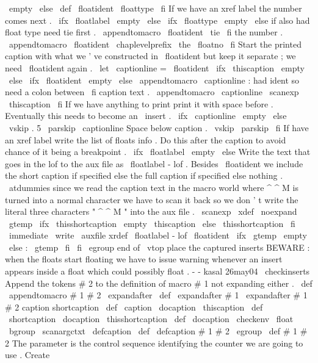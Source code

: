 {{{{{\
empty
\
else
\
def
\
floatident
{
\
floattype
}
\
fi
%
%
If
we
have
an
xref
label
the
number
comes
next
.
\
ifx
\
floatlabel
\
empty
\
else
\
ifx
\
floattype
\
empty
\
else
%
if
also
had
float
type
need
tie
first
.
\
appendtomacro
\
floatident
{
\
tie
}
%
\
fi
%
the
number
.
\
appendtomacro
\
floatident
{
\
chaplevelprefix
\
the
\
floatno
}
%
\
fi
%
%
Start
the
printed
caption
with
what
we
'
ve
constructed
in
%
\
floatident
but
keep
it
separate
;
we
need
\
floatident
again
.
\
let
\
captionline
=
\
floatident
%
\
ifx
\
thiscaption
\
empty
\
else
\
ifx
\
floatident
\
empty
\
else
\
appendtomacro
\
captionline
{
:
}
%
had
ident
so
need
a
colon
between
\
fi
%
%
caption
text
.
\
appendtomacro
\
captionline
{
\
scanexp
\
thiscaption
}
%
\
fi
%
%
If
we
have
anything
to
print
print
it
with
space
before
.
%
Eventually
this
needs
to
become
an
\
insert
.
\
ifx
\
captionline
\
empty
\
else
\
vskip
.
5
\
parskip
\
captionline
%
%
Space
below
caption
.
\
vskip
\
parskip
\
fi
%
%
If
have
an
xref
label
write
the
list
of
floats
info
.
Do
this
%
after
the
caption
to
avoid
chance
of
it
being
a
breakpoint
.
\
ifx
\
floatlabel
\
empty
\
else
%
Write
the
text
that
goes
in
the
lof
to
the
aux
file
as
%
\
floatlabel
-
lof
.
Besides
\
floatident
we
include
the
short
%
caption
if
specified
else
the
full
caption
if
specified
else
nothing
.
{
%
\
atdummies
%
%
since
we
read
the
caption
text
in
the
macro
world
where
^
^
M
%
is
turned
into
a
normal
character
we
have
to
scan
it
back
so
%
we
don
'
t
write
the
literal
three
characters
"
^
^
M
"
into
the
aux
file
.
\
scanexp
{
%
\
xdef
\
noexpand
\
gtemp
{
%
\
ifx
\
thisshortcaption
\
empty
\
thiscaption
\
else
\
thisshortcaption
\
fi
}
%
}
%
\
immediate
\
write
\
auxfile
{
xrdef
{
\
floatlabel
-
lof
}
{
\
floatident
\
ifx
\
gtemp
\
empty
\
else
:
\
gtemp
\
fi
}
}
%
}
%
\
fi
\
egroup
%
end
of
\
vtop
%
%
place
the
captured
inserts
%
%
BEWARE
:
when
the
floats
start
floating
we
have
to
issue
warning
%
whenever
an
insert
appears
inside
a
float
which
could
possibly
%
float
.
-
-
kasal
26may04
%
\
checkinserts
}
%
Append
the
tokens
#
2
to
the
definition
of
macro
#
1
not
expanding
either
.
%
\
def
\
appendtomacro
#
1
#
2
{
%
\
expandafter
\
def
\
expandafter
#
1
\
expandafter
{
#
1
#
2
}
%
}
%
caption
shortcaption
%
\
def
\
caption
{
\
docaption
\
thiscaption
}
\
def
\
shortcaption
{
\
docaption
\
thisshortcaption
}
\
def
\
docaption
{
\
checkenv
\
float
\
bgroup
\
scanargctxt
\
defcaption
}
\
def
\
defcaption
#
1
#
2
{
\
egroup
\
def
#
1
{
#
2
}
}
%
The
parameter
is
the
control
sequence
identifying
the
counter
we
are
%
going
to
use
.
Create
}}}}
